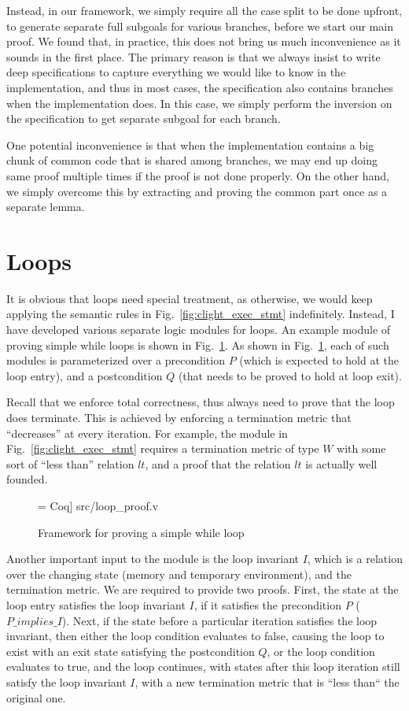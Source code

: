 Instead, in our framework, we simply require all the case split to be done upfront,
to generate separate full subgoals for various branches, before we start our main
proof. We found that, in practice, this does not bring us much inconvenience as
it sounds in the first place. The primary reason is that we always insist to
write deep specifications to capture everything we would like to know in the
implementation, and thus in most cases, the specification also contains branches
when the implementation does. In this case, we simply perform the inversion
on the specification to get separate subgoal for each branch.

One potential inconvenience is that when the implementation contains a big
chunk of common code that is shared among branches, we may end up doing
same proof multiple times if the proof is not done properly. On the other
hand, we simply overcome this by extracting and proving the common part once
as a separate lemma.

\section{Loops}

It is obvious that loops need special treatment, as otherwise, we would keep
applying the semantic rules in Fig.~\ref{fig:clight_exec_stmt} indefinitely.
Instead, I have developed various separate logic modules for loops.
An example module of proving simple while loops is shown in Fig.~\ref{fig:loop_proof}.
As shown in Fig.~\ref{fig:loop_proof}, each of such modules is parameterized
over a precondition $P$ (which is expected to hold at the loop entry), and
a postcondition $Q$ (that needs to be proved to hold at loop exit).

Recall that we enforce total correctness, thus always need to prove that
the loop does terminate. This is achieved by enforcing a termination metric that
``decreases'' at every iteration.
For example, the module in Fig.~\ref{fig:clight_exec_stmt} requires a termination
metric of type $W$ with some sort of ``less than'' relation $lt$, and a proof
that the relation $lt$ is actually well founded.


\begin{figure}
 = Coq] {src/loop_proof.v}
\caption{Framework for proving a simple while loop}
\label{fig:loop_proof}
\end{figure}

Another important input to the module is the loop invariant $I$, which is
a relation over the changing state (memory and temporary environment), and
the termination metric. We are required to provide two proofs.
First, the state at the loop entry satisfies the loop invariant $I$,
if it satisfies the precondition $P$ ($P\_implies\_I$).
Next, if the state before a particular iteration satisfies the loop
invariant, then either the loop condition evaluates to false, causing
the loop to exist with an exit state satisfying the postcondition $Q$,
or the loop condition evaluates to true, and the loop continues, with
states after this loop iteration still satisfy the loop invariant $I$,
with a new termination metric that is ``less than`` the original one.


